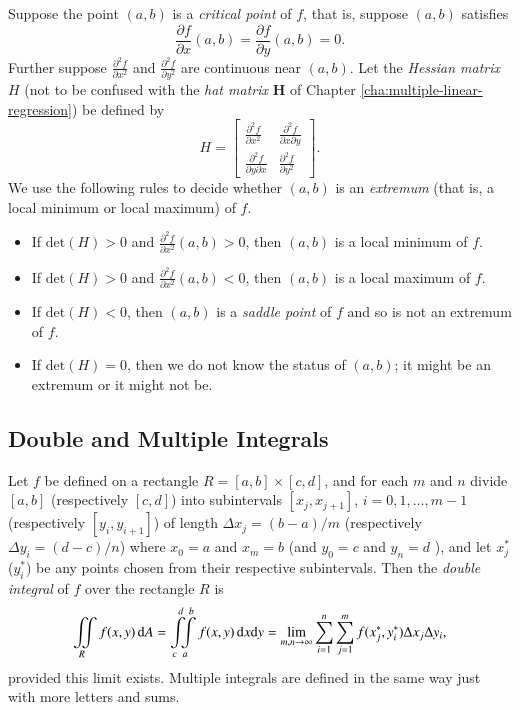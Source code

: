 \documentclass[captions=tableheading]{scrbook}
\begin{document}
Suppose the point \((a,b)\) is a \emph{critical point} of \(f\), that is, suppose \((a,b)\) satisfies 
\begin{equation}
\frac{\partial f}{\partial x}(a,b)=\frac{\partial f}{\partial y}(a,b)=0.
\end{equation}
Further suppose \(\frac{\partial^{2}f}{\partial x^{2}}\) and \(\frac{\partial^{2}f}{\partial y^{2}}\) are continuous near \((a,b)\). Let the \emph{Hessian matrix} \(H\) (not to be confused with the \emph{hat matrix} \(\mathbf{H}\) of Chapter \ref{cha:multiple-linear-regression}) be defined by
\begin{equation}
H = 
\begin{bmatrix}
\frac{\partial^{2}f}{\partial x^{2}} & \frac{\partial^{2}f}{\partial x\partial y}\\
\frac{\partial^{2}f}{\partial y\partial x} & \frac{\partial^{2}f}{\partial y^{2}}
\end{bmatrix}.
\end{equation}
We use the following rules to decide whether \((a,b)\) is an \emph{extremum} (that is, a local minimum or local maximum) of \(f\).
\begin{itemize}
\item If \(\mbox{det}(H)>0\) and \(\frac{\partial^{2}f}{\partial x^{2}}(a,b)>0\), then \((a,b)\) is a local minimum of \(f\).
\item If \(\mbox{det}(H)>0\) and \(\frac{\partial^{2}f}{\partial x^{2}}(a,b)<0\), then \((a,b)\) is a local maximum of \(f\).
\item If \(\mbox{det}(H)<0\), then \((a,b)\) is a \emph{saddle point} of \(f\) and so is not an extremum of \(f\).
\item If \(\mbox{det}(H)=0\), then we do not know the status of \((a,b)\); it might be an extremum or it might not be.
\end{itemize}
\subsection{Double and Multiple Integrals}
\label{sec-21-6-3}

Let \(f\) be defined on a rectangle \(R=[a,b]\times[c,d]\), and for each \(m\) and \(n\) divide \([a,b]\) (respectively \([c,d]\)) into subintervals \([x_{j},x_{j+1}]\), \(i=0,1,\ldots,m-1\) (respectively \([y_{i},y_{i+1}]\)) of length \(\Delta x_{j}=(b-a)/m\) (respectively \(\Delta y_{i}=(d-c)/n\)) where \(x_{0}=a\) and \(x_{m}=b\) (and \(y_{0}=c\) and \(y_{n}=d\) ), and let \(x_{j}^{\ast}\) (\(y_{i}^{\ast}\)) be any points chosen from their respective subintervals. Then the \emph{double integral} of \(f\) over the rectangle \(R\) is
\begin{equation}
\iintop_{R}f(x,y)\,\mathrm{d} A=\intop_{c}^{d}\!\!\!\intop_{a}^{b}f(x,y)\,\mathrm{d} x\mathrm{d} y=\lim_{m,n\to\infty}\sum_{i=1}^{n}\sum_{j=1}^{m}f(x_{j}^{\ast},y_{i}^{\ast})\Delta x_{j}\Delta y_{i},
\end{equation}
provided this limit exists. Multiple integrals are defined in the same way just with more letters and sums.
\end{document}
